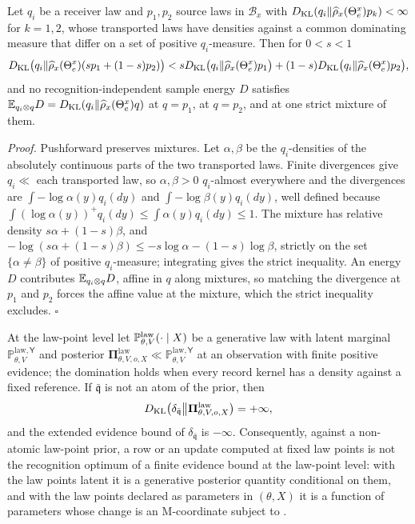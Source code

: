 Let $q_i$ be a receiver law and $p_1,p_2$ source laws in $\mathcal B_x$ with
$D_{\mathrm{KL}}(q_i\Vert\widehat\rho_x(\Theta_e^x)p_k)<\infty$ for $k=1,2$, whose transported laws have densities
against a common dominating measure that differ on a set of positive $q_i$-measure. Then for $0<s<1$
\[
D_{\mathrm{KL}}\bigl(q_i\Vert\widehat\rho_x(\Theta_e^x)(sp_1+(1-s)p_2)\bigr)
<sD_{\mathrm{KL}}\bigl(q_i\Vert\widehat\rho_x(\Theta_e^x)p_1\bigr)+(1-s)D_{\mathrm{KL}}\bigl(q_i\Vert\widehat\rho_x(\Theta_e^x)p_2\bigr),
\]
and no recognition-independent sample energy $D$ satisfies
$\mathbb E_{q_i\otimes q}D=D_{\mathrm{KL}}(q_i\Vert\widehat\rho_x(\Theta_e^x)q)$ at $q=p_1$, at $q=p_2$, and at one strict
mixture of them. 

\noindent\emph{Proof.}
Pushforward preserves mixtures. Let $\alpha,\beta$ be the $q_i$-densities of the absolutely continuous parts
of the two transported laws. Finite divergences give $q_i\ll$ each transported law, so $\alpha,\beta>0$
$q_i$-almost everywhere and the divergences are $\int-\log\alpha(y)q_i(dy)$ and $\int-\log\beta(y)q_i(dy)$,
well defined because $\int(\log\alpha(y))^+q_i(dy)\leq\int\alpha(y)q_i(dy)\leq1$. The mixture has relative
density $s\alpha+(1-s)\beta$, and $-\log(s\alpha+(1-s)\beta)\leq-s\log\alpha-(1-s)\log\beta$, strictly on the
set $\{\alpha\neq\beta\}$ of positive $q_i$-measure; integrating gives the strict inequality. An energy $D$
contributes $\mathbb E_{q_i\otimes q}D$, affine in $q$ along mixtures, so matching the divergence at $p_1$ and $p_2$
forces the affine value at the mixture, which the strict inequality excludes. \hfill$\square$

At the law-point level let $\mathbb P^{\mathrm{law}}_{\theta,V}(\cdot\mid X)$ be a generative law with
latent marginal $\mathbb P^{\mathrm{law},\mathsf Y}_{\theta,V}$ and posterior
$\boldsymbol\Pi^{\mathrm{law}}_{\theta,V,o,X}\ll\mathbb P^{\mathrm{law},\mathsf Y}_{\theta,V}$ at an observation
with finite positive evidence; the domination holds when every record kernel has a density against a fixed
reference. If $\bar{\mathfrak q}$ is not an atom of the prior, then
\begin{equation}
D_{\mathrm{KL}}\bigl(\delta_{\bar{\mathfrak q}}\big\Vert\boldsymbol\Pi^{\mathrm{law}}_{\theta,V,o,X}\bigr)=+\infty,
\label{eq:prob-law-point-point-mass}
\end{equation}
and the extended evidence bound of $\delta_{\bar{\mathfrak q}}$ is $-\infty$. Consequently, against a
non-atomic law-point prior, a row or an update computed at fixed law points is not the recognition
optimum of a finite evidence bound at the law-point level: with the law points latent it is a generative
posterior quantity conditional on them, and with the law points declared as parameters in $(\theta,X)$ it
is a function of parameters whose change is an M-coordinate subject to
. 

